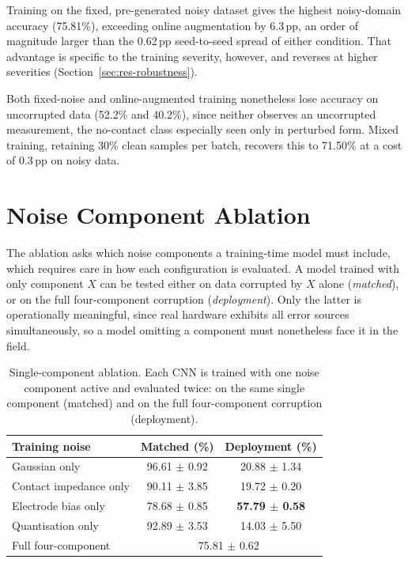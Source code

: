 Training on the fixed, pre-generated noisy dataset gives the highest noisy-domain accuracy (75.81\%), exceeding online augmentation by 6.3\,pp, an order of magnitude larger than the 0.62\,pp seed-to-seed spread of either condition. That advantage is specific to the training severity, however, and reverses at higher severities (Section~\ref{sec:res-robustness}).

Both fixed-noise and online-augmented training nonetheless lose accuracy on uncorrupted data (52.2\% and 40.2\%), since neither observes an uncorrupted measurement, the no-contact class especially seen only in perturbed form. Mixed training, retaining 30\% clean samples per batch, recovers this to 71.50\% at a cost of 0.3\,pp on noisy data.

\section{Noise Component Ablation}
\label{sec:res-ablation}

The ablation asks which noise components a training-time model must include, which requires care in how each configuration is evaluated. A model trained with only component $X$ can be tested either on data corrupted by $X$ alone (\emph{matched}), or on the full four-component corruption (\emph{deployment}). Only the latter is operationally meaningful, since real hardware exhibits all error sources simultaneously, so a model omitting a component must nonetheless face it in the field.

\begin{table}[htbp]
\centering
\caption[Single-component noise ablation]{Single-component ablation. Each CNN is trained with one noise component active and evaluated twice: on the same single component (matched) and on the full four-component corruption (deployment).}
\label{tab:ablation-single}
\small
\setlength{\tabcolsep}{8pt}
\renewcommand{\arraystretch}{1.15}
\begin{tabular}{@{}lcc@{}}
\toprule
\textbf{Training noise} & \textbf{Matched (\%)} & \textbf{Deployment (\%)} \\
\midrule
Gaussian only           & 96.61 $\pm$ 0.92 & 20.88 $\pm$ 1.34 \\
Contact impedance only  & 90.11 $\pm$ 3.85 & 19.72 $\pm$ 0.20 \\
Electrode bias only     & 78.68 $\pm$ 0.85 & \textbf{57.79 $\pm$ 0.58} \\
Quantisation only       & 92.89 $\pm$ 3.53 & 14.03 $\pm$ 5.50 \\
\midrule
Full four-component     & \multicolumn{2}{c}{75.81 $\pm$ 0.62} \\
\bottomrule
\end{tabular}
\end{table}

